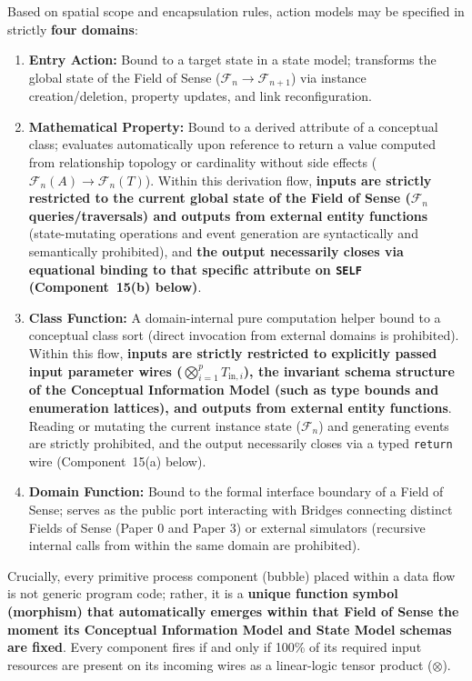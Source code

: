 \documentclass[11pt,a4paper]{article}
\theoremstyle{definition}
\theoremstyle{plain}
\theoremstyle{remark}
\begin{document}
Based on spatial scope and encapsulation rules, action models may be specified in strictly \textbf{four domains}:
\begin{enumerate}
    \item \textbf{Entry Action:} Bound to a target state in a state model; transforms the global state of the Field of Sense ($\mathcal{F}_n \to \mathcal{F}_{n+1}$) via instance creation/deletion, property updates, and link reconfiguration.
    \item \textbf{Mathematical Property:} Bound to a derived attribute of a conceptual class; evaluates automatically upon reference to return a value computed from relationship topology or cardinality without side effects ($\mathcal{F}_n(A) \to \mathcal{F}_n(T)$). Within this derivation flow, \textbf{inputs are strictly restricted to the current global state of the Field of Sense ($\mathcal{F}_n$ queries/traversals) and outputs from external entity functions} (state-mutating operations and event generation are syntactically and semantically prohibited), and \textbf{the output necessarily closes via equational binding to that specific attribute on \texttt{SELF} (Component~15(b) below)}.
    \item \textbf{Class Function:} A domain-internal pure computation helper bound to a conceptual class sort (direct invocation from external domains is prohibited). Within this flow, \textbf{inputs are strictly restricted to explicitly passed input parameter wires ($\bigotimes_{i=1}^p T_{\mathrm{in}, i}$), the invariant schema structure of the Conceptual Information Model (such as type bounds and enumeration lattices), and outputs from external entity functions}. Reading or mutating the current instance state ($\mathcal{F}_n$) and generating events are strictly prohibited, and the output necessarily closes via a typed \texttt{return} wire (Component~15(a) below).
    \item \textbf{Domain Function:} Bound to the formal interface boundary of a Field of Sense; serves as the public port interacting with Bridges connecting distinct Fields of Sense (Paper 0 and Paper 3) or external simulators (recursive internal calls from within the same domain are prohibited).
\end{enumerate}

Crucially, every primitive process component (bubble) placed within a data flow is not generic program code; rather, it is a \textbf{unique function symbol (morphism) that automatically emerges within that Field of Sense the moment its Conceptual Information Model and State Model schemas are fixed}. Every component fires if and only if 100\% of its required input resources are present on its incoming wires as a linear-logic tensor product ($\otimes$).
\end{document}

